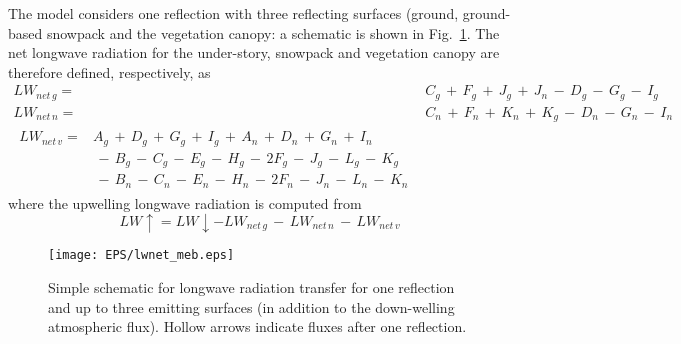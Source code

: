 The model considers one reflection with three reflecting surfaces (ground, 
ground-based snowpack and the vegetation canopy: a schematic is shown
in Fig.~\ref{fig:meb_lwsnow_vg}. 
%
The net longwave radiation for the under-story, snowpack and vegetation canopy are therefore defined, 
respectively, as
%
\begin{subequations}\label{eq:meb_lw_gn_terms}
\begin{align}
 \label{eq:meb_lw_net_gn}
LW_{net\,g} =& C_{g} \,+\, F_{g} \,+\, J_{g}\,+\, J_{n}
\,-\,D_{g} \,-\, G_{g} \,-\, I_{g}
\\
 \label{eq:meb_lw_net_nn}
LW_{net\,n} =& C_{n} \,+\, F_{n} \,+\, K_{n}\,+\, K_{g}
\,-\,D_{n} \,-\, G_{n} \,-\, I_{n}
\\
 \label{eq:meb_lw_net_vn}
\begin{split}
LW_{net\,v} =& A_{g} \,+\, D_{g} \,+\, G_{g} \,+\, I_{g}
\,+\, A_{n} \,+\, D_{n} \,+\, G_{n} \,+\, I_{n}
\\
& \,-\, B_{g} \,-\, C_{g}\,-\, E_{g} \,-\, H_{g} \,-\, 2F_{g} \,-\, J_{g} \,-\, L_{g}\,-\, K_{g}
\\
&\,-\, B_{n} \,-\, C_{n}\,-\, E_{n} \,-\, H_{n} \,-\, 2F_{n} \,-\, J_{n} \,-\, L_{n}\,-\, K_{n}
%
\end{split}
\end{align}
\end{subequations}
%
where the upwelling longwave radiation is computed from
%
\begin{equation}
\label{eq:meb_lwup_gvn}
%
LW\uparrow = LW\downarrow - LW_{net\,g} \,-\, LW_{net\,n} \,-\, LW_{net\,v}
%
\end{equation}
%

\begin{figure}[!b]
\centerline{
\texttt{[image: EPS/lwnet\_meb.eps]}}
\caption{Simple schematic for longwave radiation transfer for one
reflection and up to three emitting surfaces (in addition to the
down-welling atmospheric flux). Hollow arrows indicate
fluxes after one reflection.}
\label{fig:meb_lwsnow_vg}
\end{figure}



